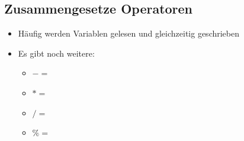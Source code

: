 \subsection{Zusammengesetze Operatoren}
\begin{frame}
	\slidehead

	\begin{itemize}
		\item Häufig werden Variablen gelesen und gleichzeitig geschrieben
	\end{itemize}


	\begin{itemize}
		\item Es gibt noch weitere:
		\begin{itemize}
			\item $-=$
			\item $*=$
			\item $/=$
			\item $\%=$
		\end{itemize}
	\end{itemize}
\end{frame}


\livecoding

